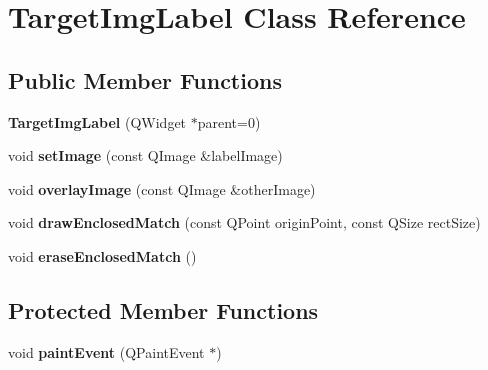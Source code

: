 \hypertarget{classTargetImgLabel}{
\section{TargetImgLabel Class Reference}
\label{classTargetImgLabel}
}
\subsection*{Public Member Functions}
\begin{DoxyCompactItemize}
\item 
\hypertarget{classTargetImgLabel_acb3dcfa8b9616be0a355c90db81aaba2}{
{\bfseries TargetImgLabel} (QWidget $\ast$parent=0)}
\label{classTargetImgLabel_acb3dcfa8b9616be0a355c90db81aaba2}

\item 
\hypertarget{classTargetImgLabel_a2ec40d8850e3d9cc4d5c9984412c0cfb}{
void {\bfseries setImage} (const QImage \&labelImage)}
\label{classTargetImgLabel_a2ec40d8850e3d9cc4d5c9984412c0cfb}

\item 
\hypertarget{classTargetImgLabel_a719f70b755013a216f2a7b10352dd0fe}{
void {\bfseries overlayImage} (const QImage \&otherImage)}
\label{classTargetImgLabel_a719f70b755013a216f2a7b10352dd0fe}

\item 
\hypertarget{classTargetImgLabel_ab835774d14df1e93cb0fd010d1a2e699}{
void {\bfseries drawEnclosedMatch} (const QPoint originPoint, const QSize rectSize)}
\label{classTargetImgLabel_ab835774d14df1e93cb0fd010d1a2e699}

\item 
\hypertarget{classTargetImgLabel_ad060485d97c7797339243b23f3ea05ef}{
void {\bfseries eraseEnclosedMatch} ()}
\label{classTargetImgLabel_ad060485d97c7797339243b23f3ea05ef}

\end{DoxyCompactItemize}
\subsection*{Protected Member Functions}
\begin{DoxyCompactItemize}
\item 
\hypertarget{classTargetImgLabel_a30f9fc1657bdf5a9459bd78d5a94c65b}{
void {\bfseries paintEvent} (QPaintEvent $\ast$)}
\label{classTargetImgLabel_a30f9fc1657bdf5a9459bd78d5a94c65b}

\end{DoxyCompactItemize}
